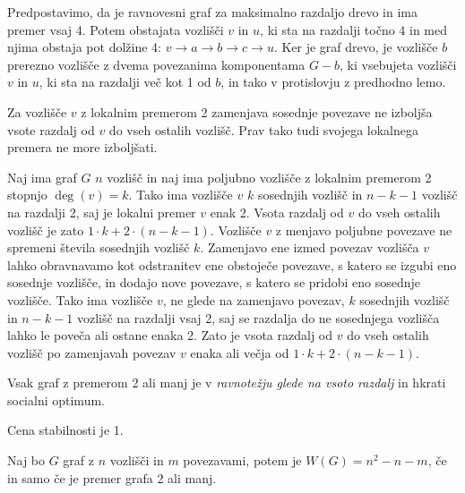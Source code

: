 \documentclass[fin1, tisk]{fmfdelo}
\begin{document}
\begin{dokaz}
Predpostavimo, da je ravnovesni graf za maksimalno razdaljo drevo in ima premer vsaj 4. Potem obstajata vozlišči \(v\) in \(u\), ki sta na razdalji točno 4 in med njima obstaja pot dolžine 4: \(v \to a \to b \to c \to u\). Ker je graf drevo, je vozlišče \(b\) prerezno vozlišče z dvema povezanima komponentama \(G - b\), ki vsebujeta vozlišči \(v\) in \(u\), ki sta na razdalji več kot 1 od \(b\), in tako v protislovju z predhodno lemo.
\end{dokaz}

\begin{lema}
Za vozlišče \(v\) z lokalnim premerom 2 zamenjava sosednje povezave ne izboljša vsote razdalj od \(v\) do vseh ostalih vozlišč. Prav tako tudi svojega lokalnega premera ne more izboljšati.
\end{lema}

\begin{dokaz}
Naj ima graf \(G\) \(n\) vozlišč in naj ima poljubno vozlišče z lokalnim premerom 2 stopnjo \(\deg(v) = k\). Tako ima vozlišče \(v\) \(k\) sosednjih vozlišč in \(n - k - 1\) vozlišč na razdalji 2, saj je lokalni premer \(v\) enak 2. Vsota razdalj od \(v\) do vseh ostalih vozlišč je zato \(1 \cdot k + 2 \cdot (n - k - 1)\). Vozlišče \(v\) z menjavo poljubne povezave ne spremeni števila sosednjih vozlišč \(k\). Zamenjavo ene izmed povezav vozlišča \(v\) lahko obravnavamo kot odstranitev ene obstoječe povezave, s katero se izgubi eno sosednje vozlišče, in dodajo nove povezave, s katero se pridobi eno sosednje vozlišče. Tako ima vozlišče \(v\), ne glede na zamenjavo povezav, \(k\) sosednjih vozlišč in \(n - k - 1\) vozlišč na razdalji vsaj 2, saj se razdalja do ne sosednjega vozlišča lahko le poveča ali ostane enaka 2. Zato je vsota razdalj od \(v\) do vseh ostalih vozlišč po zamenjavah povezav \(v\) enaka ali večja od \(1 \cdot k + 2 \cdot (n - k - 1)\).
\end{dokaz}

\begin{posledica}
Vsak graf z premerom 2 ali manj je v \textit{ravnotežju glede na vsoto razdalj} in hkrati socialni optimum.
\end{posledica}

\begin{posledica}
Cena stabilnosti je 1.
\end{posledica}

\begin{izrek}
Naj bo \(G\) graf z \(n\) vozlišči in \(m\) povezavami, potem je \(W(G) = n^2 - n - m\), če in samo če je premer grafa 2 ali manj.
\end{izrek}
\end{document}
